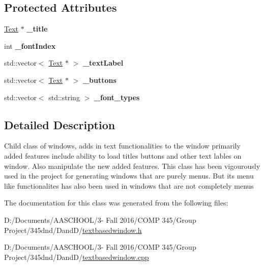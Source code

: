 \subsection*{Protected Attributes}
\begin{DoxyCompactItemize}
\item 
\hypertarget{class_text_based_window_ac0481be18d53f3e04124dd899b1253da}{}\label{class_text_based_window_ac0481be18d53f3e04124dd899b1253da} 
\hyperlink{class_text}{Text} $\ast$ {\bfseries \+\_\+title}
\item 
\hypertarget{class_text_based_window_adc84d743428eefd63fe4245297593f4a}{}\label{class_text_based_window_adc84d743428eefd63fe4245297593f4a} 
int {\bfseries \+\_\+font\+Index}
\item 
\hypertarget{class_text_based_window_a0eb57b99b6b2cde43ae330d20e205e95}{}\label{class_text_based_window_a0eb57b99b6b2cde43ae330d20e205e95} 
std\+::vector$<$ \hyperlink{class_text}{Text} $\ast$ $>$ {\bfseries \+\_\+text\+Label}
\item 
\hypertarget{class_text_based_window_abafdebbba55dd593df5ee69d76583bd9}{}\label{class_text_based_window_abafdebbba55dd593df5ee69d76583bd9} 
std\+::vector$<$ \hyperlink{class_text}{Text} $\ast$ $>$ {\bfseries \+\_\+buttons}
\item 
\hypertarget{class_text_based_window_a5a02547162c9a19f6b7d94ae4eac84ee}{}\label{class_text_based_window_a5a02547162c9a19f6b7d94ae4eac84ee} 
std\+::vector$<$ std\+::string $>$ {\bfseries \+\_\+font\+\_\+types}
\end{DoxyCompactItemize}


\subsection{Detailed Description}
Child class of windows, adds in text functionalities to the window primarily added features include ability to load titles buttons and other text lables on window. Also manipulate the new added features. This class has been vigourously used in the project for generating windows that are purely menus. But its menu like functionalites has also been used in windows that are not completely menus 

The documentation for this class was generated from the following files\+:\begin{DoxyCompactItemize}
\item 
D\+:/\+Documents/\+A\+A\+S\+C\+H\+O\+O\+L/3-\/ Fall 2016/\+C\+O\+M\+P 345/\+Group Project/345dnd/\+Dand\+D/\hyperlink{textbasedwindow_8h}{textbasedwindow.\+h}\item 
D\+:/\+Documents/\+A\+A\+S\+C\+H\+O\+O\+L/3-\/ Fall 2016/\+C\+O\+M\+P 345/\+Group Project/345dnd/\+Dand\+D/\hyperlink{textbasedwindow_8cpp}{textbasedwindow.\+cpp}\end{DoxyCompactItemize}

